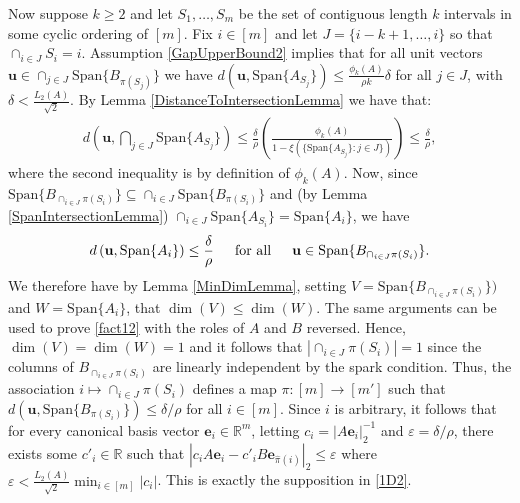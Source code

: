 \documentclass[journal, onecolumn]{IEEEtran}
\begin{document}
Now suppose $k \geq 2$ and let $S_1, \ldots, S_m$ be the set of contiguous length $k$ intervals in some cyclic ordering of $[m]$. Fix $i \in [m]$ and let $J = \{i-k+1, \ldots, i\}$ so that $\cap_{i \in J} S_i = i$. Assumption \eqref{GapUpperBound2} implies that for all unit vectors $\mathbf{u} \in \cap_{j \in J} \text{Span}\{B_{\pi(S_j)}\}$ we have $d(\mathbf{u}, \text{Span}\{A_{S_j}\}) \leq \frac{\phi_k(A)}{\rho k} \delta$ for all $j \in J$, with $\delta < \frac{L_2(A)}{\sqrt{2}}$. By Lemma \ref{DistanceToIntersectionLemma} we have that:
\begin{align}\label{sym2}
d\left( \mathbf{u}, \bigcap_{j \in J} \text{Span}\{A_{S_j}\} \right) 
\leq \frac{\delta}{\rho} \left( \frac{\phi_k(A)}{1 - \xi(\{ \text{Span}\{A_{S_j}\} : j \in J \})} \right) \leq \frac{\delta}{\rho},
\end{align}
%
where the second inequality is by definition of $\phi_k(A)$. Now, since $\text{Span}\{B_{\cap_{i \in J}\pi(S_i)}\} \subseteq \cap_{i \in J} \text{Span}\{B_{\pi(S_i)}\}$ and (by Lemma \ref{SpanIntersectionLemma}) $\cap_{i \in J}  \text{Span}\{A_{S_i}\} = \text{Span}\{A_i\}$, we have
\begin{align}\label{fact12}
d\left( \mathbf{u}, \text{Span}\{A_i\} \right) \leq \frac{\delta}{\rho} \indent \text{for all} \indent \mathbf{u} \in \text{Span}\{B_{\cap_{i \in J}\pi(S_i)}\}.
\end{align}
We therefore have by Lemma \ref{MinDimLemma}, setting $V = \text{Span}\{B_{\cap_{i \in J}\pi(S_i)}\})$ and $W = \text{Span}\{A_i\}$, that $\dim(V) \leq \dim(W)$. The same arguments can be used to prove \eqref{fact12} with the roles of $A$ and $B$ reversed. Hence, $\dim(V) = \dim(W) = 1$ and it follows that $|\cap_{i \in J} \pi(S_i)| = 1$ since the columns of $B_{\cap_{i \in J} \pi(S_i)}$ are linearly independent by the spark condition. Thus, the association $i \mapsto \cap_{i \in J} \pi(S_i)$ defines a map $\pi: [m] \to [m']$ such that $d\left( \mathbf{u}, \text{Span}\{B_{ \pi(S_i)}\}\right) \leq \delta/\rho$ for all $i \in [m]$.
Since $i$ is arbitrary, it follows that for every canonical basis vector $\mathbf{e}_i \in \mathbb{R}^m$, letting $c_i = |A\mathbf{e}_i|_2^{-1}$ and $\varepsilon = \delta/\rho$, there exists some $c'_i \in \mathbb{R}$ such that $|c_iA\mathbf{e}_i - c'_iB\mathbf{e}_{\hat \pi(i)}|_2 \leq \varepsilon$ where $\varepsilon < \frac{L_2(A)}{\sqrt{2}} \min_{i \in [m]} |c_i|$. This is exactly the supposition in \eqref{1D2}.

\end{document}
